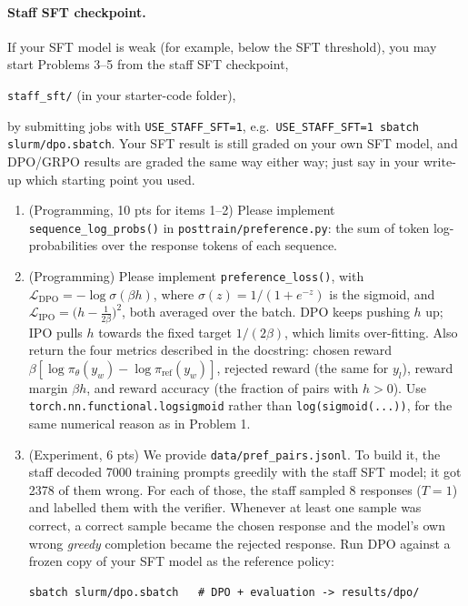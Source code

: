 \documentclass[11pt]{article}
\newcommand{\staffsft}{\file{staff\_sft/} (in your starter-code folder)}
\newcommand{\file}[1]{\texttt{#1}}
\begin{document}
\paragraph{Staff SFT checkpoint.} If your SFT model is weak (for example, below the SFT threshold), you may start
Problems 3--5 from the staff SFT checkpoint,
\begin{center}\staffsft,\end{center}
by submitting jobs with \texttt{USE\_STAFF\_SFT=1}, e.g.\ \texttt{USE\_STAFF\_SFT=1 sbatch slurm/dpo.sbatch}. Your SFT result is still graded on your own SFT model, and
DPO/GRPO results are graded the same way either way; just say in your write-up which starting point you used.
\begin{enumerate}
  \item (Programming, 10 pts for items 1--2) Please implement \texttt{sequence\_log\_probs()} in
        \file{posttrain/preference.py}: the sum of token log-probabilities over the response tokens of each sequence.
  \item (Programming) Please implement \texttt{preference\_loss()}, with
        $\mathcal{L}_\text{DPO} = -\log\sigma(\beta h)$, where $\sigma(z) = 1/(1+e^{-z})$ is the sigmoid, and
        $\mathcal{L}_\text{IPO} = \bigl(h - \tfrac{1}{2\beta}\bigr)^2$, both averaged over the batch. DPO keeps
        pushing $h$ up; IPO pulls $h$ towards the fixed target $1/(2\beta)$, which limits over-fitting. Also return
        the four metrics described in the docstring: chosen reward $\beta[\log\pi_\theta(y_w)-\log\pi_\text{ref}(y_w)]$,
        rejected reward (the same for $y_l$), reward margin $\beta h$, and reward accuracy (the fraction of
        pairs with $h>0$). Use \texttt{torch.nn.functional.logsigmoid} rather than \texttt{log(sigmoid(...))}, for
        the same numerical reason as in Problem 1.
  \item (Experiment, 6 pts) We provide \file{data/pref\_pairs.jsonl}. To build it, the staff decoded 7000 training
        prompts greedily with the staff SFT model; it got 2378 of them wrong. For each of those, the staff sampled 8
        responses ($T=1$) and labelled them with the verifier. Whenever at least one sample was correct, a correct
        sample became the chosen response and the model's own wrong \emph{greedy} completion became the rejected
        response. Run DPO against a frozen copy of your SFT model as the reference policy:
\begin{lstlisting}
sbatch slurm/dpo.sbatch   # DPO + evaluation -> results/dpo/\end{lstlisting}

\end{enumerate}
\end{document}
